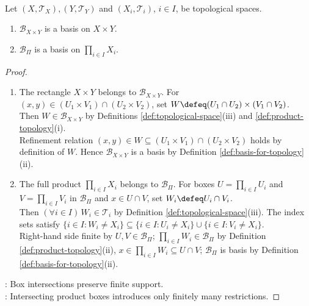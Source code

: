 \begin{proposition} \label{prop:product-collections-are-bases} \\
Let $(X,\mathcal{T}_X),(Y,\mathcal{T}_Y)$ and $(X_i,\mathcal{T}_i)$, $i\in I$, be topological spaces.
\begin{enumerate}[label=(\roman*)]
\setlength{\itemsep}{0pt}
\item $\mathcal{B}_{X\times Y}$ is a basis on $X\times Y$.
\item $\mathcal{B}_{\Pi}$ is a basis on $\prod\limits_{i\in I}X_i$.
\end{enumerate}
\begin{proof}
\begin{enumerate}[label=(\roman*)]
\setlength{\itemsep}{0pt}
\item The rectangle $X\times Y$ belongs to $\mathcal{B}_{X\times Y}$. For $(x,y)\in(U_1\times V_1)\cap(U_2\times V_2)$, set $W\defeq(U_1\cap U_2)\times(V_1\cap V_2)$.\\
Then $W\in\mathcal{B}_{X\times Y}$ by Definitions \ref{def:topological-space}(iii) and \ref{def:product-topology}(i).\\
Refinement relation $(x,y)\in W\subseteq(U_1\times V_1)\cap(U_2\times V_2)$ holds by definition of $W$. Hence $\mathcal{B}_{X\times Y}$ is a basis by Definition \ref{def:basis-for-topology}(ii).
\item The full product $\prod\limits_{i\in I}X_i$ belongs to $\mathcal{B}_{\Pi}$. For boxes $U=\prod\limits_{i\in I}U_i$ and $V=\prod\limits_{i\in I}V_i$ in $\mathcal{B}_{\Pi}$ and $x\in U\cap V$, set $W_i\defeq U_i\cap V_i$.\\
Then $(\forall i\in I)\,W_i\in\mathcal{T}_i$ by Definition \ref{def:topological-space}(iii). The index sets satisfy $\{i\in I:W_i\neq X_i\}\subseteq\{i\in I:U_i\neq X_i\}\cup\{i\in I:V_i\neq X_i\}$.\\
Right-hand side finite by $U,V\in\mathcal{B}_{\Pi}$; $\prod\limits_{i\in I}W_i\in\mathcal{B}_{\Pi}$ by Definition \ref{def:product-topology}(ii),  $x\in\prod\limits_{i\in I}W_i\subseteq U\cap V$; $\mathcal{B}_{\Pi}$ is basis by Definition \ref{def:basis-for-topology}(ii).
\end{enumerate}
: Box intersections preserve finite support.\\
: Intersecting product boxes introduces only finitely many restrictions.
\end{proof}
\end{proposition}

